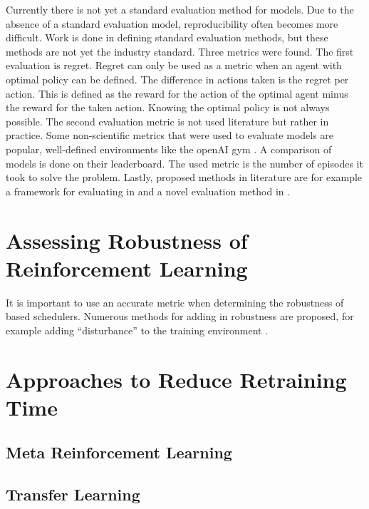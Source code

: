 Currently there is not yet a standard evaluation method for \rl models. Due to
the absence of a standard evaluation model, reproducibility often becomes more
difficult. Work is done in defining standard evaluation methods, but these
methods are not yet the industry standard. Three metrics were found. The first
evaluation is regret. Regret can only be used as a metric when an agent with
optimal policy can be defined. The difference in actions taken is the regret
per action. This is defined as the reward for the action of the optimal agent
minus the reward for the taken action. Knowing the optimal policy is not
always possible. The second evaluation metric is not used literature but
rather in practice. Some non-scientific metrics that were used to evaluate \rl
models are popular, well-defined environments like the openAI gym
\cite{gym2016}. A comparison of \rl models is done on their
leaderboard. The used metric
is the number of episodes it took to solve the problem. Lastly, proposed
methods in literature are for example a framework for evaluating \rl in
 and a novel evaluation method in .


\section{Assessing Robustness of Reinforcement Learning}

It is important to use an accurate metric when determining the robustness of \rl
based schedulers. Numerous methods for adding in robustness are proposed, for
example adding ``disturbance'' to the training environment
\cite{morimoto2005}.




\section{Approaches to Reduce Retraining Time}

\subsection{Meta Reinforcement Learning}

\subsection{Transfer Learning}

